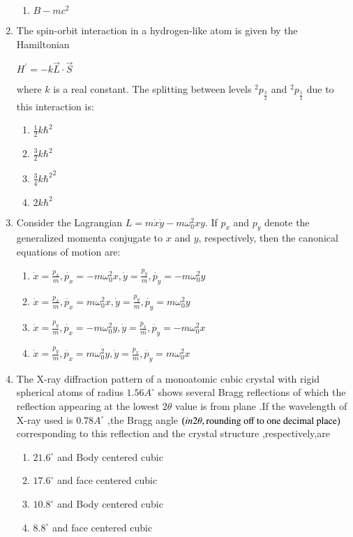 \documentclass[journal]{IEEEtran}
\begin{document}
\begin{enumerate}
\begin{enumerate}
\item $B-mc^2$
\end{enumerate}
\item The spin-orbit interaction in a hydrogen-like atom is given by the Hamiltonian
\begin{center}
 $H^{\prime} = -k\overrightarrow{L}\cdot\overrightarrow{S} $  
\end{center}
where $k$  is a real constant. The splitting between levels $^2p_{\frac{3}{2}}$ and $^2p_{\frac{1}{2}}$ due to this interaction is:
\begin{enumerate}
	\item $\frac{1}{2}k{\hbar}^2$ 
	\item $\frac{3}{2}k{\hbar}^2$ 
	\item $\frac{3}{4}k{\hbar^2}^2$ 
	\item $2k{\hbar}^2$
\end{enumerate}
\item Consider the Lagrangian $L=m\dot{x}\dot{y}-m\omega_0^2xy$. If $p_x$ and $p_y$ denote the generalized momenta conjugate to $x$ and $y$, respectively, then the canonical equations of motion are:
\begin{enumerate}
\item $\dot{x}=\frac{p_x}{m},\dot{p_x}=-m\omega_0^2x,\dot{y}=\frac{p_y}{m},\dot{p_y}=-m\omega_0^2y$
\item $\dot{x} = \frac{p_x}{m},\dot{p_x}=m\omega_0^2x,\dot{y}=\frac{p_y}{m},\dot{p_y}=m\omega_0^2y$
\item $\dot{x}=\frac{p_y}{m},\dot{p_x}=-m\omega_0^2 y,\dot{y}=\frac{p_x}{m},\dot{p_y}=-m\omega_0^2x$
\item $\dot{x}=\frac{p_y}{m},\dot{p_x}=m\omega_0^2y,\dot{y}=\frac{p_x}{m},\dot{p_y}=m\omega_0^2 x$
\end{enumerate}
\item The X-ray diffraction pattern of a monoatomic cubic crystal with rigid spherical atoms of radius $1.56A^{\circ}$ shows several Bragg reflections of which the reflection appearing at the lowest $2\theta$ value is from  plane .If the wavelength of X-ray used is $0.78A^{\circ}$ ,the Bragg angle $\left(in 2\theta , \text{rounding off to one decimal place}\right)$ corresponding to this reflection and the crystal structure ,respectively,are
\begin{enumerate}
\item $21.6^{\circ}$ and Body centered cubic
\item $17.6^{\circ}$ and face centered cubic
\item $10.8^{\circ}$ and Body centered cubic
\item $8.8^{\circ}$ and face centered cubic
\end{enumerate}
\end{enumerate}
\end{document}
